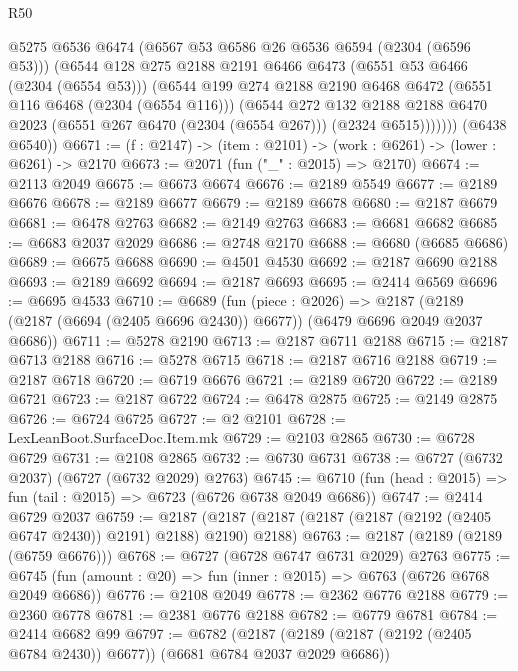 \begin{lexlean}{R50}
\begin{coremodule}
            @5275
            @6536
            @6474
            (@6567 @53 @6586 @26 @6536 @6594 (@2304 (@6596 @53)))
            (@6544
              @128
              @275
              @2188
              @2191
              @6466
              @6473
              (@6551 @53 @6466 (@2304 (@6554 @53)))
              (@6544
                @199
                @274
                @2188
                @2190
                @6468
                @6472
                (@6551 @116 @6468 (@2304 (@6554 @116)))
                (@6544
                  @272
                  @132
                  @2188
                  @2188
                  @6470
                  @2023
                  (@6551 @267 @6470 (@2304 (@6554 @267)))
                  (@2324 @6515)))))))
      (@6438 @6540))
@6671 := (f : @2147) -> (item : @2101) -> (work : @6261) -> (lower : @6261) -> @2170
@6673 := @2071 (fun ("_" : @2015) => @2170)
@6674 := @2113 @2049
@6675 := @6673 @6674
@6676 := @2189 @5549
@6677 := @2189 @6676
@6678 := @2189 @6677
@6679 := @2189 @6678
@6680 := @2187 @6679
@6681 := @6478 @2763
@6682 := @2149 @2763
@6683 := @6681 @6682
@6685 := @6683 @2037 @2029
@6686 := @2748 @2170
@6688 := @6680 (@6685 @6686)
@6689 := @6675 @6688
@6690 := @4501 @4530
@6692 := @2187 @6690 @2188
@6693 := @2189 @6692
@6694 := @2187 @6693
@6695 := @2414 @6569
@6696 := @6695 @4533
@6710 := @6689
    (fun (piece : @2026) =>
    @2187 (@2189 (@2187 (@6694 (@2405 @6696 @2430)) @6677)) (@6479 @6696 @2049 @2037 @6686))
@6711 := @5278 @2190
@6713 := @2187 @6711 @2188
@6715 := @2187 @6713 @2188
@6716 := @5278 @6715
@6718 := @2187 @6716 @2188
@6719 := @2187 @6718
@6720 := @6719 @6676
@6721 := @2189 @6720
@6722 := @2189 @6721
@6723 := @2187 @6722
@6724 := @6478 @2875
@6725 := @2149 @2875
@6726 := @6724 @6725
@6727 := @2 @2101
@6728 := LexLeanBoot.SurfaceDoc.Item.mk
@6729 := @2103 @2865
@6730 := @6728 @6729
@6731 := @2108 @2865
@6732 := @6730 @6731
@6738 := @6727 (@6732 @2037) (@6727 (@6732 @2029) @2763)
@6745 := @6710 (fun (head : @2015) => fun (tail : @2015) => @6723 (@6726 @6738 @2049 @6686))
@6747 := @2414 @6729 @2037
@6759 := @2187 (@2187 (@2187 (@2187 (@2187 (@2192 (@2405 @6747 @2430)) @2191) @2188) @2190) @2188)
@6763 := @2187 (@2189 (@2189 (@6759 @6676)))
@6768 := @6727 (@6728 @6747 @6731 @2029) @2763
@6775 := @6745 (fun (amount : @20) => fun (inner : @2015) => @6763 (@6726 @6768 @2049 @6686))
@6776 := @2108 @2049
@6778 := @2362 @6776 @2188
@6779 := @2360 @6778
@6781 := @2381 @6776 @2188
@6782 := @6779 @6781
@6784 := @2414 @6682 @99
@6797 := @6782
    (@2187 (@2189 (@2187 (@2192 (@2405 @6784 @2430)) @6677)) (@6681 @6784 @2037 @2029 @6686))

\end{coremodule}
\end{lexlean}
